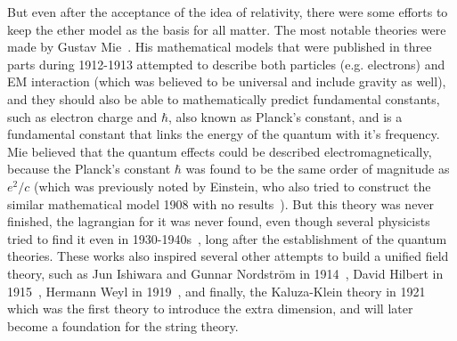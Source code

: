 But even after the acceptance of the idea of relativity, there were some efforts to keep the ether model as the basis for all matter. The most notable theories were made by Gustav Mie~\cite{lib:theory_mie1, lib:theory_mie2, lib:theory_mie3}. His mathematical models that were published in three parts during 1912-1913 attempted to describe both particles (e.g. electrons) and EM interaction (which was believed to be universal and include gravity as well), and they should also be able to mathematically predict fundamental constants, such as electron charge and $\hbar$, also known as Planck's constant, and is a fundamental constant that links the energy of the quantum with it's frequency. Mie believed that the quantum effects could be described electromagnetically, because the Planck's constant $\hbar$ was found to be the same order of magnitude as $e^{2}/c$ (which was previously noted by Einstein, who also tried to construct the similar mathematical model 1908 with no results~\cite{lib:theory_e_sc_c}). But this theory was never finished, the lagrangian for it was never found, even though several physicists tried to find it even in 1930-1940s~\cite{lib:theory_mie_last}, long after the establishment of the quantum theories. These works also inspired several other attempts to build a unified field theory, such as Jun Ishiwara and Gunnar Nordstr{\"o}m in 1914~\cite{lib:theory_ishiwara_mie, lib:theory_nordstrom_mie}, David Hilbert in 1915~\cite{lib:theory_hilbert_mie1, lib:theory_hilbert_mie2}, Hermann Weyl in 1919~\cite{lib:theory_weyl_mie}, and finally, the Kaluza-Klein theory in 1921~\cite{lib:theory_kaluza_mie} which was the first theory to introduce the extra dimension, and will later become a foundation for the string theory.

